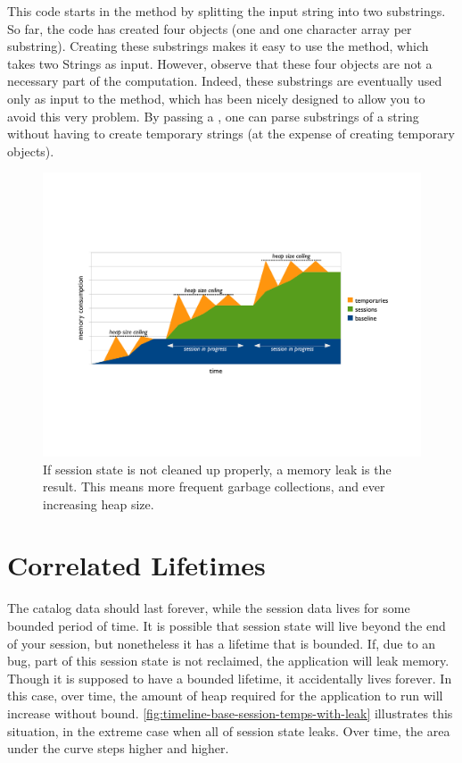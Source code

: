 This code starts in the  method by splitting the input string into two
substrings. So far, the code has created four objects (one  and one
character array per substring). Creating these substrings makes it easy to use
the  method, which takes two Strings as input. However, observe that
these four objects are not a necessary part of the computation. Indeed, these
substrings are eventually used only as input to the 
 method, which has been nicely designed to allow you to avoid this
very problem. By passing a , one can parse substrings of a
string without having to create temporary strings (at the expense of creating
temporary  objects).


\begin{figure}
	\centering
	\includegraphics[width=\textwidth]{part4/Figures/lifetime/timeline-base-session-temps-with-leak}
	\caption{If session state is not cleaned up
	properly, a memory leak is the result. This means more frequent garbage
	collections, and ever increasing heap size.}
	\label{fig:timeline-base-session-temps-with-leak}
\end{figure}

\section{Correlated Lifetimes}
\label{sec:correlated-lifetime}

The catalog data should last forever, while the
session data lives for some bounded period of time. It is possible that session
state will live beyond the end of your session, but nonetheless it has a
lifetime that is bounded. If, due to an bug, part of this session state is not
reclaimed, the application will leak memory. Though it is supposed to have a bounded lifetime, it
accidentally lives forever. In this
case, over time, the amount of heap required for the application to run will increase without bound.
\autoref{fig:timeline-base-session-temps-with-leak} illustrates this situation,
in the extreme case when all of session state leaks. Over time, the area under
the curve steps higher and higher.

